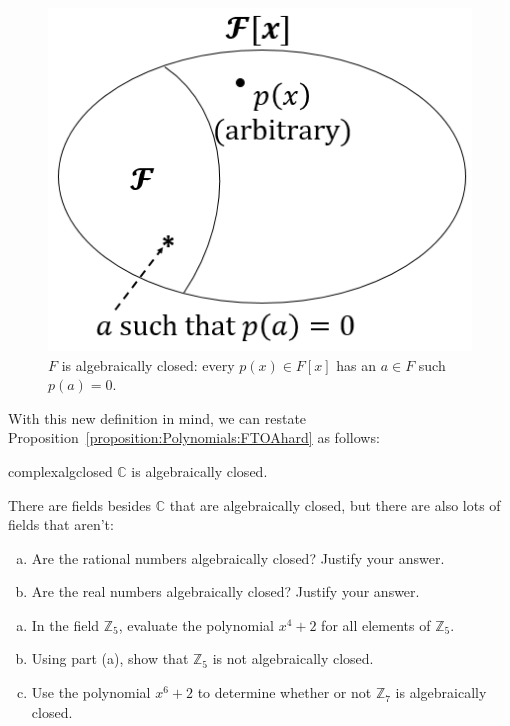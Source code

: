 \begin{figure}
\begin{center}
\includegraphics[scale=0.35]{images/algebraically_closed.png}
\caption{$F$ is algebraically closed: every $p(x)\in F[x]$ has an $a\in F$ such  $p(a)=0$.}\label{algebraicallyclosed}
\end{center}
\end{figure}

With this new definition in mind, we can restate Proposition~\ref{proposition:Polynomials:FTOAhard} as follows: 

\begin{prop}{complexalgclosed}
$\mathbb{C}$ is algebraically closed.
\end{prop}

There are fields  besides $\mathbb{C}$ that are algebraically closed,  but there are  also  lots of fields that aren't:

\begin{exercise}{}
\begin {enumerate}[(a)]
\item
Are the rational numbers algebraically closed? Justify your answer.
\item
Are the real numbers algebraically closed? Justify your answer.
\end{enumerate}
\end{exercise}

\begin{exercise}{}
\begin{enumerate}[(a)]
\item
In the field $\mathbb{Z}_5$, evaluate the polynomial $x^4+2$  for all elements of  $\mathbb{Z}_5$.
\item
Using part (a), show  that $\mathbb{Z}_5$ is not algebraically closed.
\item
Use the polynomial $x^6 + 2$ to determine whether or not $\mathbb{Z}_7$ is algebraically closed.
\end{enumerate}
\end{exercise}

